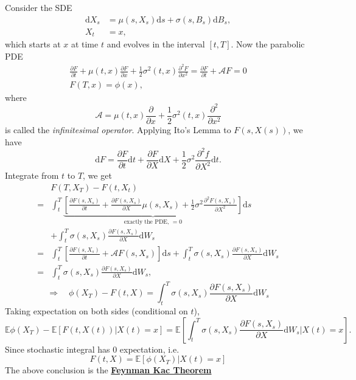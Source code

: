 \documentclass[twocolumn,landscape,10pt]{article}
\theoremstyle{definition}
\begin{document}
Consider the SDE
\begin{align*}
    \mathrm{d}X_s
    &= \mu(s,X_s)\mathrm{d}s+\sigma(s,B_s)\mathrm{d}B_s,\\
    X_t &= x,
\end{align*}
which starts at $x$ at time $t$ and evolves in the interval $\left[t,T\right]$.
Now the parabolic PDE
\begin{align*}
    \frac{\partial F}{\partial t}+\mu(t,x)\frac{\partial F}{\partial x}
    +\frac{1}{2}\sigma^2(t,x)\frac{\partial^2 F}{\partial x^2}
    =\frac{\partial F}{\partial t}+\mathcal{A}F=0 \\
    F(T,x) = \phi(x),
\end{align*}
where
\[
    \mathcal{A}=\mu(t,x)\frac{\partial}{\partial
    x}+\frac{1}{2}\sigma^2(t,x)\frac{\partial^2}{\partial x^2}
\]
is called the \emph{infinitesimal operator}.
Applying Ito's Lemma to $F(s,X(s))$, we have
\[
    \mathrm{d}F=\frac{\partial F}{\partial t}\mathrm{d}t
    +\frac{\partial F}{\partial X}\mathrm{d}X
    +\frac{1}{2}\sigma^2\frac{\partial^2 f}{\partial X^2}\mathrm{d}t.
\]
Integrate from $t$ to $T$, we get
\begin{align*}
    &F(T,X_T)-F(t,X_t)\\
    =&\int_{t}^{T}\underbrace{\left[\frac{\partial F(s,X_s)}{\partial t}
    +\frac{\partial F(s,X_s)}{\partial X}\mu(s,X_s)
    +\frac{1}{2}\sigma^2\frac{\partial^2 F(s,X_s)}{\partial X^2}
    \right]}_{\text{exactly the PDE, $=0$}}\mathrm{d}s\\
     &+\int_{t}^{T}\sigma(s,X_s)\frac{\partial F(s,X_s)}{\partial
     X}\mathrm{d}W_s \\
    =&\int_{t}^{T}\left[\frac{\partial F(s,X_s)}{\partial
    t}+\mathcal{A}F(s,X_s)\right]\mathrm{d}s+\int_{t}^{T}
    \sigma(s,X_s)\frac{\partial F(s,X_s)}{\partial X}\mathrm{d}W_s\\
    =&\int_{t}^{T}\sigma(s,X_s)\frac{\partial F(s,X_s)}{\partial
    X}\mathrm{d}W_s,
\end{align*}
\[
    \Longrightarrow\quad
    \phi(X_T)-F(t,X)=\int_{t}^{T}\sigma(s,X_s)\frac{\partial F(s,X_s)}{\partial
    X}\mathrm{d}W_s
\]
Taking expectation on both sides (conditional on $t$),
\[
    \mathbb{E}\phi(X_T)-\mathbb{E}[F(t,X(t))|X(t)=x]
    =\mathbb{E}\left[\int_{t}^{T}\sigma(s,X_s)\frac{\partial F(s,X_s)}{\partial
    X}\mathrm{d}W_s|X(t)=x\right].
\]
Since stochastic integral has 0 expectation, i.e.\
\[
    F(t,X)=\mathbb{E}\left[\phi(X_T)|X(t)=x\right]
\]
The above conclusion is the \textbf{\underline{Feynman Kac Theorem}}
\end{document}
